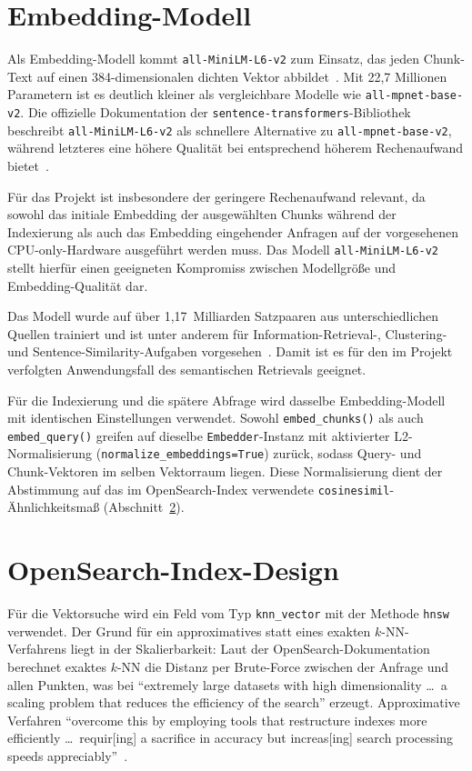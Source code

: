 \section{Embedding-Modell}
\label{sec:embedding-modell}

Als Embedding-Modell kommt \texttt{all-MiniLM-L6-v2} zum Einsatz, das jeden
Chunk-Text auf einen 384-dimensionalen dichten Vektor abbildet~\cite{minilm-model-card}. Mit 22,7 Millionen
Parametern ist es deutlich kleiner als vergleichbare Modelle wie \texttt{all-mpnet-base-v2}. Die offizielle
Dokumentation der \texttt{sentence-\allowbreak{}transformers}-Bibliothek beschreibt \texttt{all-MiniLM-L6-v2} als
schnellere Alternative zu \texttt{all-mpnet-base-v2}, während letzteres eine höhere Qualität bei entsprechend
höherem Rechenaufwand bietet~\cite{sbert-pretrained-models}.

Für das Projekt ist insbesondere der geringere Rechenaufwand relevant, da sowohl das initiale Embedding der
ausgewählten Chunks während der Indexierung als auch das Embedding eingehender Anfragen auf der vorgesehenen
CPU-only-Hardware ausgeführt werden muss. Das Modell \texttt{all-MiniLM-L6-v2} stellt hierfür einen geeigneten
Kompromiss zwischen Modellgröße und Embedding-Qualität dar.

Das Modell wurde auf über 1,17~Milliarden Satzpaaren aus unterschiedlichen Quellen trainiert und ist unter
anderem für Information-Retrieval-, Clustering- und Sentence-Similarity-Aufgaben vorgesehen~\cite{minilm-model-card}. Damit ist es für den im Projekt verfolgten Anwendungsfall des semantischen
Retrievals geeignet.

Für die Indexierung und die spätere Abfrage wird dasselbe Embedding-Modell mit identischen Einstellungen
verwendet. Sowohl \texttt{embed\_chunks()} als auch \texttt{embed\_query()} greifen auf dieselbe
\texttt{Embedder}-Instanz mit aktivierter L2-Normalisierung
(\texttt{normalize\_\allowbreak{}embeddings=True}) zurück, sodass Query- und Chunk-Vektoren im selben
Vektorraum liegen. Diese Normalisierung dient der Abstimmung auf das im OpenSearch-Index verwendete 
\texttt{cosinesimil}-Ähnlichkeitsmaß (Abschnitt~\ref{sec:opensearch-index-design}).


\section{OpenSearch-Index-Design}
\label{sec:opensearch-index-design}
Für die Vektorsuche wird ein Feld vom Typ \texttt{knn\_vector} mit der Methode \texttt{hnsw} verwendet.
Der Grund für ein approximatives statt eines exakten $k$-NN-Verfahrens liegt in der Skalierbarkeit: Laut der OpenSearch-Dokumentation
berechnet exaktes $k$-NN die Distanz per Brute-Force zwischen der Anfrage und allen Punkten, was bei
\enquote{extremely large datasets with high dimensionality \ldots\ a scaling problem that reduces the efficiency of the search} erzeugt. 
Approximative Verfahren \enquote{overcome this by employing tools that restructure indexes more efficiently 
\ldots\ requir[ing] a sacrifice in accuracy but increas[ing] search processing speeds appreciably}~\cite{opensearch-approximate-knn}.

